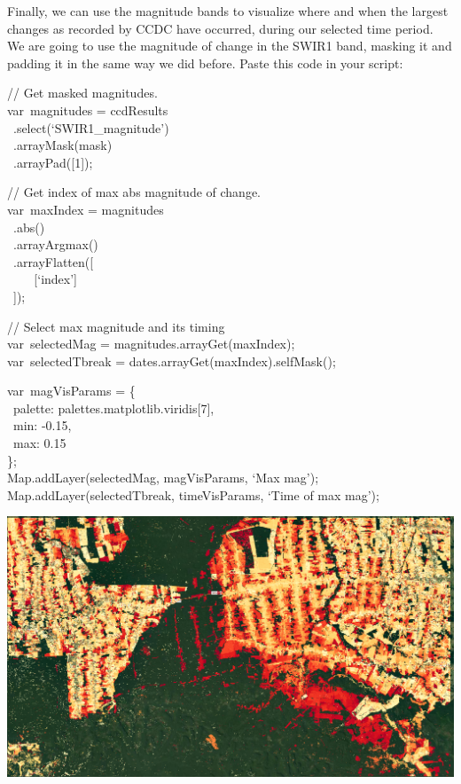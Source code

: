 \documentclass[
  letterpaper,
  DIV=11,
  numbers=noendperiod]{scrreprt}
\begin{document}
Finally, we can use the magnitude bands to visualize where and when the
largest changes as recorded by CCDC have occurred, during our selected
time period. We are going to use the magnitude of change in the SWIR1
band, masking it and padding it in the same way we did before. Paste
this code in your script:

// Get masked magnitudes.\\
var~magnitudes = ccdResults\\
\hspace*{0.333em} ~.select(`SWIR1\_magnitude')\\
\hspace*{0.333em} ~.arrayMask(mask)\\
\hspace*{0.333em} ~.arrayPad({[}1{]});

// Get index of max abs magnitude of change.\\
var~maxIndex = magnitudes\\
\hspace*{0.333em} ~.abs()\\
\hspace*{0.333em} ~.arrayArgmax()\\
\hspace*{0.333em} ~.arrayFlatten({[}\\
\hspace*{0.333em} ~ ~ ~{[}`index'{]}\\
\hspace*{0.333em} ~{]});

// Select max magnitude and its timing\\
var~selectedMag = magnitudes.arrayGet(maxIndex);\\
var~selectedTbreak = dates.arrayGet(maxIndex).selfMask();

var~magVisParams = \{\\
\hspace*{0.333em} ~palette: palettes.matplotlib.viridis{[}7{]},\\
\hspace*{0.333em} ~min: -0.15,\\
\hspace*{0.333em} ~max: 0.15\\
\};\\
Map.addLayer(selectedMag, magVisParams, `Max mag');\\
Map.addLayer(selectedTbreak, timeVisParams, `Time of max mag');

\includegraphics{./F4/image69.png}
\end{document}
